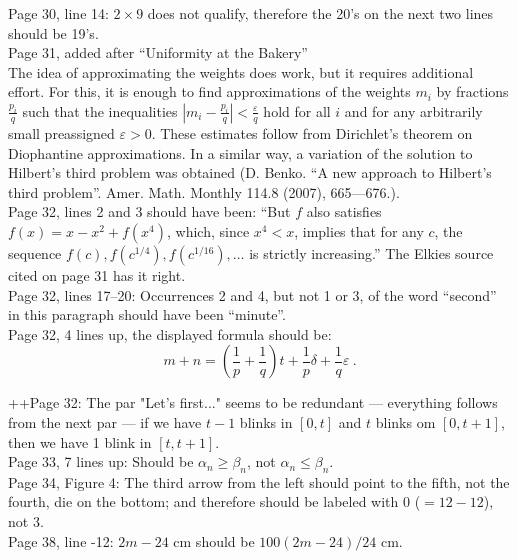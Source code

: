 \documentclass[11pt]{article}
\newcommand{\ep}{\varepsilon}
\begin{document}
Page 30, line 14: $2\times9$ does not qualify, therefore the 20's on the next two lines should be 19's.\\

Page 31, added after ``Uniformity at the Bakery''\\

The idea of approximating the weights does work, but it requires additional effort.
For this, it is enough to find approximations of the weights \( m_i \) by fractions \( \tfrac{p_i}q \) such that the inequalities
\( |m_i - \tfrac{p_i}q| < \tfrac\varepsilon q \)
hold for all \( i \) and for any arbitrarily small preassigned \( \varepsilon > 0 \).
These estimates follow from Dirichlet's theorem on Diophantine approximations.
In a similar way, a variation of the solution to Hilbert's third problem was obtained (D. Benko. ``A new approach to Hilbert’s third problem''. Amer. Math. Monthly 114.8
(2007),  665—676.).\\


Page 32, lines 2 and 3 should have been: 
``But $f$ also satisfies $f(x) = x -x^2 + f(x^4)$, which, since $x^4 < x$, implies that for any $c$, the
sequence $f(c),f(c^{1/4}),f(c^{1/16}),\dots$ is strictly increasing.''  The Elkies source cited on page 31
has it right.\\

Page 32, lines 17--20:  Occurrences 2 and 4, but not 1 or 3, of the
word ``second'' in this paragraph should have been ``minute''.\\

Page 32, 4 lines up, the displayed formula should be:
$$
m + n = \left( \frac1p + \frac 1q \right)t + \frac1p \delta + \frac1q \ep~.
$$

++Page 32: The par "Let's first..."  seems to be redundant --- everything follows from
the next par --- if we have $t-1$ blinks in $[0,t]$
and $t$ blinks om $[0,t+1]$, then we have 1 blink in $[t,t+1]$.\\

Page 33, 7 lines up: Should be $\alpha_n \ge \beta_n$, not $\alpha_n \le \beta_n$.\\

Page 34, Figure 4: The third arrow from the left should point to the fifth, not the
fourth, die on the bottom; and therefore should be labeled with 0 ($= 12 - 12$), not 3.\\

Page 38, line -12: $2m-24$ cm should be $100(2m-24)/24$ cm.\\
\end{document}
